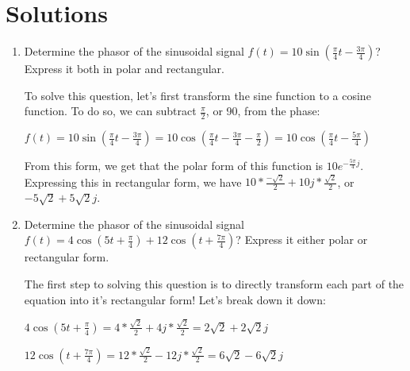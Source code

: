 \documentclass[12pt,letterpaper, onecolumn]{exam}
\begin{document}
\section{Solutions}
\begin{enumerate}
    \item{Determine the phasor of the sinusoidal signal \begin{math}f(t) = 10\sin{(\frac{\pi}{4}t - \frac{3\pi}{4})}\end{math}? Express it both in polar and rectangular.\\}

        To solve this question, let's first transform the sine function to a cosine function. To do so, we can subtract \begin{math}\frac{\pi}{2}\end{math}, or 90\degree, from the phase:
    
        \begin{center}\begin{math}
            f(t) = 10\sin{(\frac{\pi}{4}t - \frac{3\pi}{4})} =
            10\cos{(\frac{\pi}{4}t - \frac{3\pi}{4} - \frac{\pi}{2})}
            = 10\cos{(\frac{\pi}{4}t - \frac{5\pi}{4})}
        \end{math}\end{center}
    
        From this form, we get that the polar form of this function is \begin{math}10e^{-\frac{5\pi}{4}j} \end{math}. Expressing this in rectangular form, we have \begin{math}10 * \frac{-\sqrt{2}}{2} + 10j * \frac{\sqrt{2}}{2}\end{math}, or \begin{math}-5\sqrt{2} + 5\sqrt{2}j\end{math}.

    
    
    \item {Determine the phasor of the sinusoidal signal \begin{math}f(t) = 4\cos{(5t + \frac{\pi}{4})} + 12\cos{(t + \frac{7\pi}{4})}\end{math}? Express it either polar or rectangular form.\\}

        The first step to solving this question is to directly transform each part of the equation into it's rectangular form! Let's break down it down:

        \begin{center}\begin{math}
            4\cos{(5t + \frac{\pi}{4})} = 4 * \frac{\sqrt{2}}{2} + 4j* \frac{\sqrt{2}}{2} = 2\sqrt{2} + 2\sqrt{2}j            
        \end{math}\end{center}
        \begin{center}\begin{math}
           12\cos{(t + \frac{7\pi}{4})} = 12 * \frac{\sqrt{2}}{2} - 12j* \frac{\sqrt{2}}{2} = 6\sqrt{2} - 6\sqrt{2}j
        \end{math}\end{center}


\end{enumerate}
\end{document}
